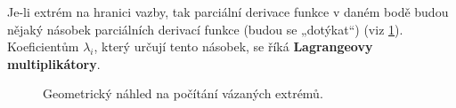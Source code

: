 \documentclass[../main.tex]{subfiles}
\begin{document}
\begin{intuition}
	Je-li extrém na hranici vazby, tak parciální derivace funkce v daném bodě budou nějaký násobek parciálních derivací funkce (budou se „dotýkat“) (viz \ref{fig:lag}).
	Koeficientům \(\lambda_i\), který určují tento násobek, se říká \textbf{Lagrangeovy multiplikátory}.

	\begin{figure}[h]
		\centering
		\hspace{3em}
		\caption{Geometrický náhled na počítání vázaných extrémů.}%
		\label{fig:lag}
	\end{figure}
\end{intuition}
\end{document}
